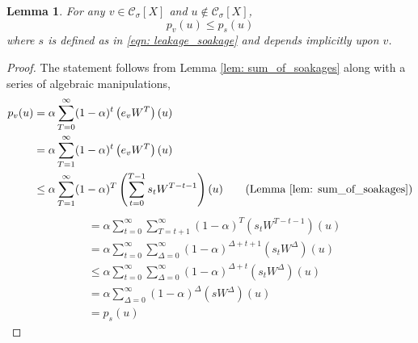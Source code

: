 \documentclass[11pt,twoside]{article}
\newtheorem{lemma}{Lemma}
\newcommand{\1}{\mathbf{1}}
\newcommand{\pbf}{p}        %
\newcommand{\Xbf}{X}             %
\newcommand{\Wbf}{W}
\newcommand{\Cset}{\mathcal{C}}
\newcommand{\Csig}{\Cset_{\sigma}}
\begin{document}
\begin{lemma}
	\label{lem: soakage_ppr_lb}
	For any $v \in \Csig[\Xbf]$ and $u \not\in \Csig[\Xbf]$,
	\begin{equation*}
	\pbf_{v}(u) \leq \pbf_{s}(u)
	\end{equation*}
	where $s$ is defined as in \eqref{eqn: leakage_soakage} and depends implicitly upon $v$.
\end{lemma}
\begin{proof}
	The statement follows from Lemma \ref{lem: sum_of_soakages} along with a series of algebraic manipulations,
	\begin{align*}
	\pbf_v(u) & = \alpha\sum_{T = 0}^{\infty} (1 - \alpha)^t \left(e_v \Wbf^T\right)(u) \\
	& = \alpha\sum_{T = 1}^{\infty} (1 - \alpha)^t \left(e_v \Wbf^T\right)(u) \\
	& \leq \alpha \sum_{T=1}^{\infty} (1 - \alpha)^T \left( \sum_{t = 0}^{T - 1} s_t \Wbf^{T - t - 1} \right)(u) \tag{Lemma \ref{lem: sum_of_soakages}}\\
	\end{align*}
	\begin{align*}
	& = \alpha \sum_{t=0}^{\infty} \sum_{T = t + 1}^{\infty} (1 - \alpha)^T \left( s_t \Wbf^{T - t - 1} \right)(u)\\
	& = \alpha \sum_{t=0}^{\infty} \sum_{\Delta = 0}^{\infty} (1 - \alpha)^{\Delta + t + 1} \left( s_t \Wbf^{\Delta} \right)(u) \\
	& \leq \alpha \sum_{t=0}^{\infty} \sum_{\Delta = 0}^{\infty} (1 - \alpha)^{\Delta + t } \left( s_t \Wbf^{\Delta} \right)(u) \\
	& = \alpha \sum_{\Delta = 0}^{\infty} (1 - \alpha)^{\Delta} \left(s \Wbf^{\Delta}\right)(u) \\
	& = \pbf_s(u)
	\end{align*}
\end{proof}
\end{document}
